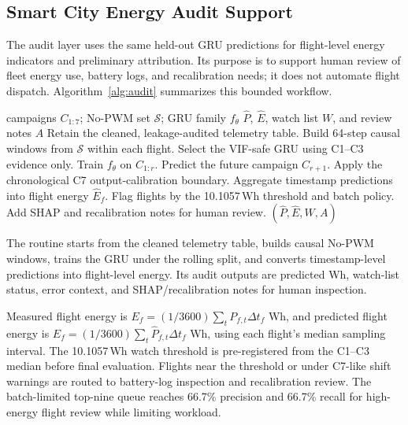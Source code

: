 \documentclass[runningheads,a4paper]{llncs}
\begin{document}
\subsection{Smart City Energy Audit Support}

The audit layer uses the same held-out GRU predictions for flight-level energy indicators and preliminary attribution. Its purpose is to support human review of fleet energy use, battery logs, and recalibration needs; it does not automate flight dispatch. Algorithm~\ref{alg:audit} summarizes this bounded workflow.

\begin{algorithm}[!htbp]
\caption{Rolling No-PWM flight-level energy audit.}
\label{alg:audit}
\begin{algorithmic}[1]
\REQUIRE campaigns $C_{1:7}$; No-PWM set $\mathcal{S}$; GRU family $f_\theta$
\ENSURE $\hat{P}$, $\hat{E}$, watch list $W$, and review notes $A$
\STATE Retain the cleaned, leakage-audited telemetry table.
\STATE Build 64-step causal windows from $\mathcal{S}$ within each flight.
\STATE Select the VIF-safe GRU using C1--C3 evidence only.
  \STATE Train $f_\theta$ on $C_{1:r}$.
  \STATE Predict the future campaign $C_{r+1}$.
\ENDFOR
\STATE Apply the chronological C7 output-calibration boundary.
\STATE Aggregate timestamp predictions into flight energy $\hat{E}_f$.
\STATE Flag flights by the 10.1057\,Wh threshold and batch policy.
\STATE Add SHAP and recalibration notes for human review.
\RETURN $(\hat{P}, \hat{E}, W, A)$
\end{algorithmic}
\end{algorithm}

The routine starts from the cleaned telemetry table, builds causal No-PWM windows, trains the GRU under the rolling split, and converts timestamp-level predictions into flight-level energy. Its audit outputs are predicted Wh, watch-list status, error context, and SHAP/recalibration notes for human inspection.

Measured flight energy is $E_f=(1/3600)\sum_t P_{f,t}\Delta t_f$ Wh, and predicted flight energy is $\hat{E}_f=(1/3600)\sum_t\hat{P}_{f,t}\Delta t_f$ Wh, using each flight's median sampling interval. The 10.1057\,Wh watch threshold is pre-registered from the C1--C3 median before final evaluation. Flights near the threshold or under C7-like shift warnings are routed to battery-log inspection and recalibration review. The batch-limited top-nine queue reaches 66.7\% precision and 66.7\% recall for high-energy flight review while limiting workload.
\end{document}
